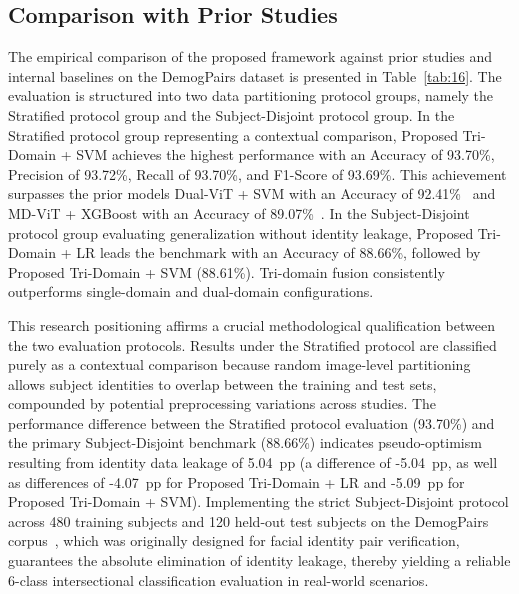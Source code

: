 \subsection{Comparison with Prior Studies}
\label{sec:comparison_with_prior_studies}
\label{sec:comparison_prior}

The empirical comparison of the proposed framework against prior studies and internal baselines on the DemogPairs dataset is presented in Table~\ref{tab:16}. The evaluation is structured into two data partitioning protocol groups, namely the Stratified protocol group and the Subject-Disjoint protocol group. In the Stratified protocol group representing a contextual comparison, Proposed Tri-Domain + SVM achieves the highest performance with an Accuracy of 93.70\%, Precision of 93.72\%, Recall of 93.70\%, and F1-Score of 93.69\%. This achievement surpasses the prior models Dual-ViT + SVM with an Accuracy of 92.41\%~\cite{ref19} and MD-ViT + XGBoost with an Accuracy of 89.07\%~\cite{ref20}. In the Subject-Disjoint protocol group evaluating generalization without identity leakage, Proposed Tri-Domain + LR leads the benchmark with an Accuracy of 88.66\%, followed by Proposed Tri-Domain + SVM (88.61\%). Tri-domain fusion consistently outperforms single-domain and dual-domain configurations.

This research positioning affirms a crucial methodological qualification between the two evaluation protocols. Results under the Stratified protocol are classified purely as a contextual comparison because random image-level partitioning allows subject identities to overlap between the training and test sets, compounded by potential preprocessing variations across studies. The performance difference between the Stratified protocol evaluation (93.70\%) and the primary Subject-Disjoint benchmark (88.66\%) indicates pseudo-optimism resulting from identity data leakage of 5.04~pp (a difference of -5.04~pp, as well as differences of -4.07~pp for Proposed Tri-Domain + LR and -5.09~pp for Proposed Tri-Domain + SVM). Implementing the strict Subject-Disjoint protocol across 480 training subjects and 120 held-out test subjects on the DemogPairs corpus~\cite{ref25}, which was originally designed for facial identity pair verification, guarantees the absolute elimination of identity leakage, thereby yielding a reliable 6-class intersectional classification evaluation in real-world scenarios.
